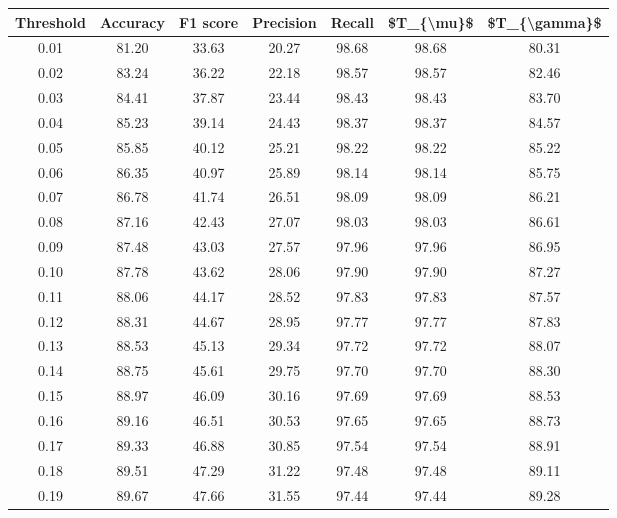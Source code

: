 \begin{tabular}{|c|c|c|c|c|c|c|}
\hline
 Threshold &  Accuracy &  F1 score &  Precision &  Recall &  \$T\_\{\textbackslash mu\}\$ &  \$T\_\{\textbackslash gamma\}\$ \\
\hline
      0.01 &     81.20 &     33.63 &      20.27 &   98.68 &      98.68 &         80.31 \\
      0.02 &     83.24 &     36.22 &      22.18 &   98.57 &      98.57 &         82.46 \\
      0.03 &     84.41 &     37.87 &      23.44 &   98.43 &      98.43 &         83.70 \\
      0.04 &     85.23 &     39.14 &      24.43 &   98.37 &      98.37 &         84.57 \\
      0.05 &     85.85 &     40.12 &      25.21 &   98.22 &      98.22 &         85.22 \\
      0.06 &     86.35 &     40.97 &      25.89 &   98.14 &      98.14 &         85.75 \\
      0.07 &     86.78 &     41.74 &      26.51 &   98.09 &      98.09 &         86.21 \\
      0.08 &     87.16 &     42.43 &      27.07 &   98.03 &      98.03 &         86.61 \\
      0.09 &     87.48 &     43.03 &      27.57 &   97.96 &      97.96 &         86.95 \\
      0.10 &     87.78 &     43.62 &      28.06 &   97.90 &      97.90 &         87.27 \\
      0.11 &     88.06 &     44.17 &      28.52 &   97.83 &      97.83 &         87.57 \\
      0.12 &     88.31 &     44.67 &      28.95 &   97.77 &      97.77 &         87.83 \\
      0.13 &     88.53 &     45.13 &      29.34 &   97.72 &      97.72 &         88.07 \\
      0.14 &     88.75 &     45.61 &      29.75 &   97.70 &      97.70 &         88.30 \\
      0.15 &     88.97 &     46.09 &      30.16 &   97.69 &      97.69 &         88.53 \\
      0.16 &     89.16 &     46.51 &      30.53 &   97.65 &      97.65 &         88.73 \\
      0.17 &     89.33 &     46.88 &      30.85 &   97.54 &      97.54 &         88.91 \\
      0.18 &     89.51 &     47.29 &      31.22 &   97.48 &      97.48 &         89.11 \\
      0.19 &     89.67 &     47.66 &      31.55 &   97.44 &      97.44 &         89.28 \\

\end{tabular}
